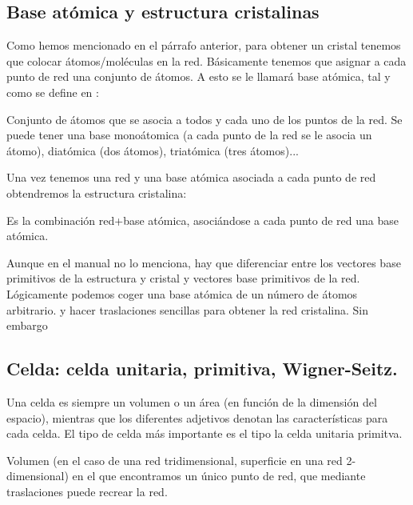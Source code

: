 \subsection{Base atómica y estructura cristalinas}

Como hemos mencionado en el párrafo anterior, para obtener un cristal tenemos que colocar átomos/moléculas en la red. Básicamente tenemos que asignar a cada punto de red una conjunto de átomos. A esto se le llamará base atómica, tal y como se define en \cite{Fisica_del_Estado_Solido}:

\begin{definition}
    Conjunto de átomos que se asocia a todos y cada uno de los puntos de la red. Se puede tener una base monoátomica (a cada punto de la red se le asocia un átomo), diatómica (dos átomos), triatómica (tres átomos)...
    \label{Def:01-Base_atomica}
\end{definition}

Una vez tenemos una red y una base atómica asociada a cada punto de red obtendremos la estructura cristalina:

\begin{definition}
    Es la combinación red+base atómica, asociándose a cada punto de red una base atómica. 
\end{definition}

Aunque en el manual \cite{Fisica_del_Estado_Solido} no lo menciona, hay que diferenciar entre los vectores base primitivos de la estructura y cristal y vectores base primitivos de la red. Lógicamente podemos coger una base atómica de un número de átomos arbitrario. y hacer traslaciones sencillas para obtener la red cristalina. Sin embargo 

\subsection{Celda: celda unitaria, primitiva, Wigner-Seitz.}

Una celda es siempre un volumen o un área (en función de la dimensión del espacio), mientras que los diferentes adjetivos denotan las características para cada celda. El tipo de celda más importante es el tipo la celda unitaria primitva.

\begin{definition}
	Volumen (en el caso de una red tridimensional, superficie en una red 2-dimensional) en el que encontramos un único punto de red, que mediante traslaciones puede recrear la red. 
\end{definition}



